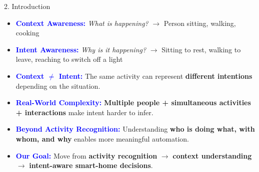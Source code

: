 \documentclass[aspectratio=169,11pt]{beamer}
\begin{document}

\begin{frame}{2. Introduction}

\begin{itemize}
    \setlength{\itemsep}{0.5em}

    \item \textcolor{blue}{\textbf{Context Awareness:}}
    \textit{What is happening?}
    $\rightarrow$ Person sitting, walking, cooking

    \item \textcolor{blue}{\textbf{Intent Awareness:}}
    \textit{Why is it happening?}
    $\rightarrow$ Sitting to rest, walking to leave, reaching to switch off a light

    \item \textcolor{blue}{\textbf{Context $\neq$ Intent:}}
    The same activity can represent \textbf{different intentions}
    depending on the situation.

    \item \textcolor{blue}{\textbf{Real-World Complexity:}}
    \textbf{Multiple people + simultaneous activities + interactions}
    make intent harder to infer.

    \item \textcolor{blue}{\textbf{Beyond Activity Recognition:}}
    Understanding \textbf{who is doing what, with whom, and why}
    enables more meaningful automation.

    \item \textcolor{blue}{\textbf{Our Goal:}}
    Move from \textbf{activity recognition}
    $\rightarrow$ \textbf{context understanding}
    $\rightarrow$ \textbf{intent-aware smart-home decisions}.
\end{itemize}

\end{frame}


\end{document}
